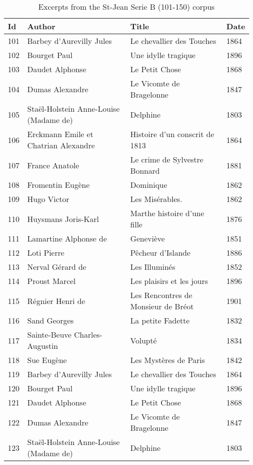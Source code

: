 \begin{table}
  \caption{Excerpts from the St-Jean Serie B (101-150) corpus}
  \label{tbl:st_jean_corpus_3}
  \begin{tabular}{l l l l}
    \toprule
    \textbf{Id} &
    \textbf{Author} &
    \textbf{Title} &
    \textbf{Date} \\
    \midrule
    101 & Barbey d'Aurevilly Jules & Le chevallier des Touches & 1864 \\
    102 & Bourget Paul & Une idylle tragique & 1896 \\
    103 & Daudet Alphonse & Le Petit Chose & 1868 \\
    104 & Dumas Alexandre & Le Vicomte de Bragelonne & 1847 \\
    105 & Staël-Holstein Anne-Louise (Madame de) & Delphine & 1803 \\
    106 & Erckmann Emile et Chatrian Alexandre & Histoire d’un conscrit de 1813 & 1864 \\
    107 & France Anatole & Le crime de Sylvestre Bonnard & 1881 \\
    108 & Fromentin Eugène & Dominique & 1862 \\
    109 & Hugo Victor & Les Misérables. & 1862 \\
    110 & Huysmans Joris-Karl & Marthe histoire d’une fille & 1876 \\
    111 & Lamartine Alphonse de & Geneviève & 1851 \\
    112 & Loti Pierre & Pêcheur d’Islande & 1886 \\
    113 & Nerval Gérard de & Les Illuminés & 1852 \\
    114 & Proust Marcel & Les plaisirs et les jours & 1896 \\
    115 & Régnier Henri de & Les Rencontres de Monsieur de Bréot & 1901 \\
    116 & Sand Georges & La petite Fadette & 1832 \\
    117 & Sainte-Beuve Charles-Augustin & Volupté & 1834 \\
    118 & Sue Eugène & Les Mystères de Paris & 1842 \\
    119 & Barbey d'Aurevilly Jules & Le chevallier des Touches & 1864 \\
    120 & Bourget Paul & Une idylle tragique & 1896 \\
    121 & Daudet Alphonse & Le Petit Chose & 1868 \\
    122 & Dumas Alexandre & Le Vicomte de Bragelonne & 1847 \\
    123 & Staël-Holstein Anne-Louise (Madame de) & Delphine & 1803 \\

\end{tabular}
\end{table}
